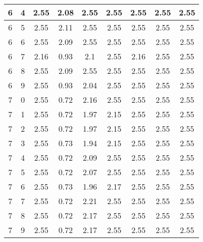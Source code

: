 \begin{longtable}{|c|c||c||c|c|c||c|c|c|}
	6 & 4 & 2.55 & 2.08 & 2.55 & 2.55 & 2.55 & 2.55 & 2.55 \\ \hline
	6 & 5 & 2.55 & 2.11 & 2.55 & 2.55 & 2.55 & 2.55 & 2.55 \\ \hline
	6 & 6 & 2.55 & 2.09 & 2.55 & 2.55 & 2.55 & 2.55 & 2.55 \\ \hline
	6 & 7 & 2.16 & 0.93 & 2.1 & 2.55 & 2.16 & 2.55 & 2.55 \\ \hline
	6 & 8 & 2.55 & 2.09 & 2.55 & 2.55 & 2.55 & 2.55 & 2.55 \\ \hline
	6 & 9 & 2.55 & 0.93 & 2.04 & 2.55 & 2.55 & 2.55 & 2.55 \\ \hline
	7 & 0 & 2.55 & 0.72 & 2.16 & 2.55 & 2.55 & 2.55 & 2.55 \\ \hline
	7 & 1 & 2.55 & 0.72 & 1.97 & 2.15 & 2.55 & 2.55 & 2.55 \\ \hline
	7 & 2 & 2.55 & 0.72 & 1.97 & 2.15 & 2.55 & 2.55 & 2.55 \\ \hline
	7 & 3 & 2.55 & 0.73 & 1.94 & 2.15 & 2.55 & 2.55 & 2.55 \\ \hline
	7 & 4 & 2.55 & 0.72 & 2.09 & 2.55 & 2.55 & 2.55 & 2.55 \\ \hline
	7 & 5 & 2.55 & 0.72 & 2.07 & 2.55 & 2.55 & 2.55 & 2.55 \\ \hline
	7 & 6 & 2.55 & 0.73 & 1.96 & 2.17 & 2.55 & 2.55 & 2.55 \\ \hline
	7 & 7 & 2.55 & 0.72 & 2.21 & 2.55 & 2.55 & 2.55 & 2.55 \\ \hline
	7 & 8 & 2.55 & 0.72 & 2.17 & 2.55 & 2.55 & 2.55 & 2.55 \\ \hline
	7 & 9 & 2.55 & 0.72 & 2.17 & 2.55 & 2.55 & 2.55 & 2.55 \\ \hline
\end{longtable}
\clearpage{}
